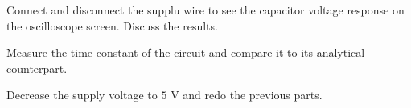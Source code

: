 \documentclass[11pt]{article}
\begin{document}
\begin{question}
\begin{subquestion}{Connect and disconnect the supplu wire to see the capacitor voltage response on the oscilloscope screen. Discuss the results.} 
\answer{}
\end{subquestion}

\begin{subquestion}{Measure the time constant of the circuit and compare it to its analytical counterpart.} 
\answer{}
\end{subquestion}

\begin{subquestion}{Decrease the supply voltage to $5$ V and redo the previous parts.} 
\answer{}
\end{subquestion}


\end{question}

\end{document}
